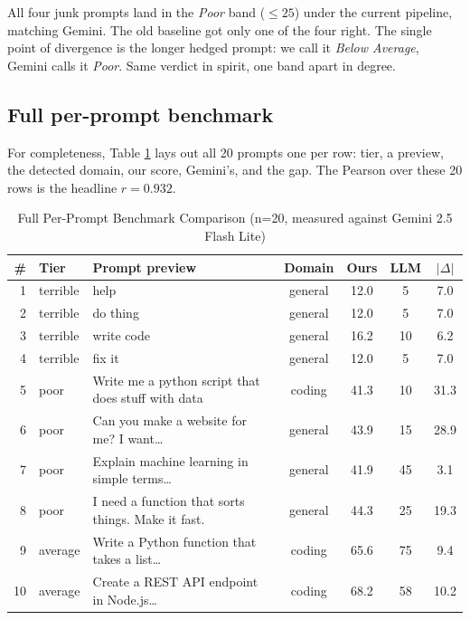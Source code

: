 \documentclass[conference]{IEEEtran}
\begin{document}
All four junk prompts land in the \emph{Poor} band ($\leq 25$) under the current pipeline, matching Gemini. The old baseline got only one of the four right. The single point of divergence is the longer hedged prompt: we call it \emph{Below Average}, Gemini calls it \emph{Poor}. Same verdict in spirit, one band apart in degree.

\subsection{Full per-prompt benchmark}
For completeness, Table \ref{tab:fullbench} lays out all 20 prompts one per row: tier, a preview, the detected domain, our score, Gemini's, and the gap. The Pearson over these 20 rows is the headline $r = 0.932$.

\begin{table}[t]
\centering
\caption{Full Per-Prompt Benchmark Comparison (n=20, measured against Gemini 2.5 Flash Lite)}
\label{tab:fullbench}
\small
\begin{tabularx}{\textwidth}{rl X cccc}
\toprule
\textbf{\#} & \textbf{Tier} & \textbf{Prompt preview} & \textbf{Domain} & \textbf{Ours} & \textbf{LLM} & \textbf{$|\Delta|$} \\
\midrule
1  & terrible  & help                                                 & general & 12.0 & 5    & 7.0  \\
2  & terrible  & do thing                                             & general & 12.0 & 5    & 7.0  \\
3  & terrible  & write code                                           & general & 16.2 & 10   & 6.2  \\
4  & terrible  & fix it                                               & general & 12.0 & 5    & 7.0  \\
5  & poor      & Write me a python script that does stuff with data   & coding  & 41.3 & 10   & 31.3 \\
6  & poor      & Can you make a website for me? I want\ldots          & general & 43.9 & 15   & 28.9 \\
7  & poor      & Explain machine learning in simple terms\ldots       & general & 41.9 & 45   & 3.1  \\
8  & poor      & I need a function that sorts things. Make it fast.   & general & 44.3 & 25   & 19.3 \\
9  & average   & Write a Python function that takes a list\ldots      & coding  & 65.6 & 75   & 9.4  \\
10 & average   & Create a REST API endpoint in Node.js\ldots          & coding  & 68.2 & 58   & 10.2 \\

\end{tabularx}
\end{table}
\end{document}
